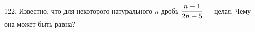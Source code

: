 122. Известно, что для некоторого натурального $n$ дробь $\cfrac{n - 1}{2n - 5}$ --- целая. Чему она может быть
равна?\\
